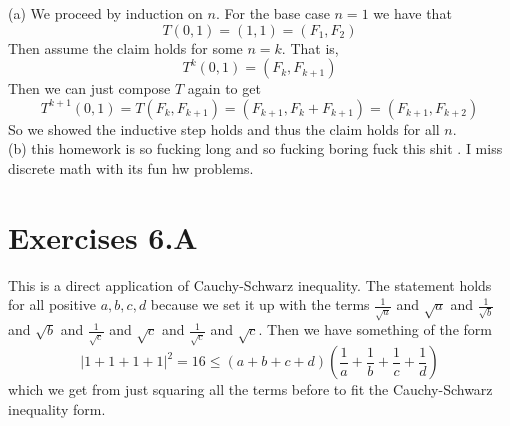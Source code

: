 \documentclass[10pt, twocolumn]{article}
\begin{document}
\begin{q}[16]
    (a)
    We proceed by induction on $ n $. For the base case $ n = 1 $ we have that 
    $$ T(0, 1) = (1, 1) = (F_1, F_2) $$
    Then assume the claim holds for some $ n = k $. That is, 
    $$ T^k(0, 1) = (F_k, F_{k + 1}) $$
    Then we can just compose $ T $ again to get
    $$ T^{k+1}(0, 1) = T(F_k, F_{k + 1}) = (F_{k + 1}, F_k + F_{k + 1}) = (F_{k + 1}, F_{k + 2})$$
    So we showed the inductive step holds and thus the claim holds for all $ n $. \\
    (b) this homework is so fucking long and so fucking boring fuck this shit . I miss discrete math with its fun hw problems.
\end{q}

\section{Exercises 6.A}
\begin{q}[11]
    This is a direct application of Cauchy-Schwarz inequality. 
    The statement holds for all positive $ a, b, c, d $ because we set it up with the terms 
    $ \frac{1}{\sqrt{a}} $ and $ \sqrt{a} $ and 
    $ \frac{1}{\sqrt{b}} $ and $ \sqrt{b} $ and 
    $ \frac{1}{\sqrt{c}} $ and $ \sqrt{c} $ and 
    $ \frac{1}{\sqrt{c}} $ and $ \sqrt{c} $. 
    Then we have something of the form
    $$ | 1 + 1 + 1 + 1 |^2 = 16 \leq (a+b+c+d)\left(\frac{1}{a}+\frac{1}{b}+\frac{1}{c}+\frac{1}{d}\right)$$
    which we get from just squaring all the terms before to fit the Cauchy-Schwarz inequality form.
\end{q}
\end{document}
